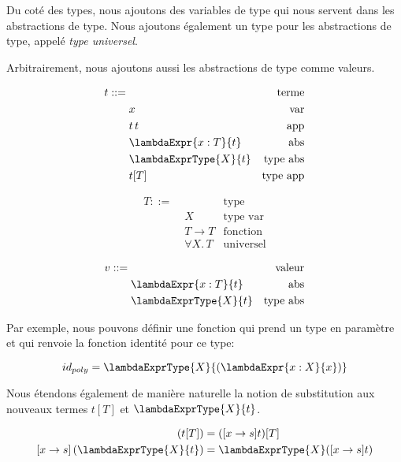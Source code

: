 Du coté des types, nous ajoutons des variables de type qui nous servent
dans les abstractions de type. Nous ajoutons également un type pour les
abstractions de type, appelé \textit{type universel}.

Arbitrairement, nous ajoutons aussi les abstractions de type comme valeurs.

\begin{minipage}{0.45\textwidth}
  \begin{align*}
    t ::= & \, & \text{terme} \\
          & \; x & \text{var} \\
          & \; t \, t & \text{app} \\
          & \; \lambdaExpr{x : T}{t} & \text{abs} \\
          & \; \lambdaExprType{X}{t} & \text{type abs} \\
          & \; t[T] & \text{type app}
  \end{align*}
\end{minipage}
\begin{minipage}{0.45\textwidth}
  \begin{align*}
    T ::= & \, & \text{type} \\
          & \; X & \text{type var} \\
          & \; T \rightarrow T & \text{fonction} \\
          & \; \forall X . \, T & \text{universel}
  \end{align*}
\end{minipage}

  \begin{align*}
    v ::= & \, & \text{valeur} \\
          & \; \lambdaExpr{x : T}{t} & \text{abs} \\
          & \; \lambdaExprType{X}{t} & \text{type abs}
  \end{align*}

Par exemple, nous pouvons définir une fonction qui prend un type en paramètre et
qui renvoie la fonction identité pour ce type:

\begin{equation*}
  id_{poly} = \lambdaExprType{X}{(\lambdaExpr{x : X}{x})}
\end{equation*}

Nous étendons également de manière naturelle la notion de substitution aux
nouveaux termes $t[T]$ et $\lambdaExprType{X}{t}$.

\begin{align*}
  [x \rightarrow s] \, (t[T]) & = ([x \rightarrow s]t)[T] \\
  [x \rightarrow s] \, (\lambdaExprType{X}{t}) & = \lambdaExprType{X}([x \rightarrow s]t)
\end{align*}

